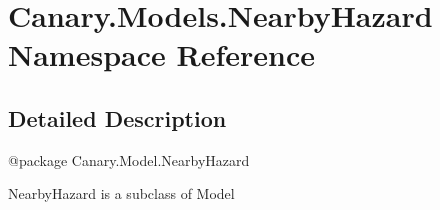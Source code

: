 \hypertarget{namespace_canary_1_1_models_1_1_nearby_hazard}{\section{Canary.\-Models.\-Nearby\-Hazard Namespace Reference}
\label{namespace_canary_1_1_models_1_1_nearby_hazard}
}


\subsection{Detailed Description}
\begin{DoxyVerb}@package Canary.Model.NearbyHazard

NearbyHazard is a subclass of Model
\end{DoxyVerb}
 